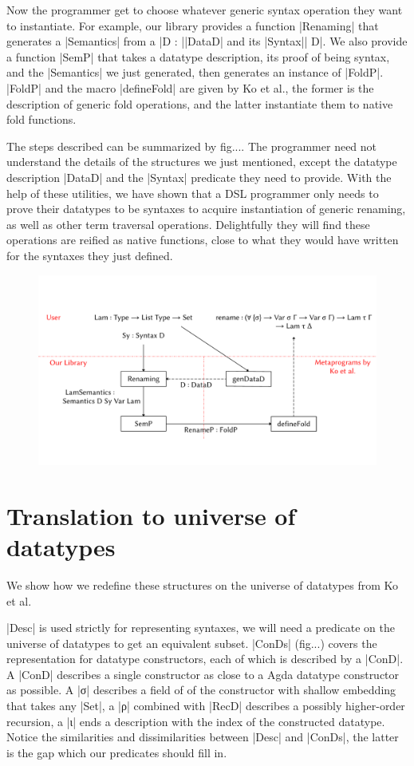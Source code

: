 \documentclass[sigplan,review,fleqn]{acmart}
\renewcommand{\verb}{\collectverb{\color{AgdaFunction}}}
\newcommand{\con}{\collectverb{\color{AgdaInductiveConstructor}}}
\newcommand{\macro}{\collectverb{\color{AgdaMacro}}}
\newcommand{\name}{\collectverb{\color{AgdaSymbol}}}
\begin{document}
Now the programmer get to choose whatever generic syntax operation they want to instantiate.
For example, our library provides a function \verb|Renaming| that generates a \verb|Semantics| from a \name|D : |\verb|DataD| and its \verb|Syntax|\name| D|. 
We also provide a function \verb|SemP| that takes a datatype description, its proof of being syntax, and the \verb|Semantics| we just generated, then generates an instance of \verb|FoldP|.
\verb|FoldP| and the macro \macro|defineFold| are given by Ko et al., the former is the description of generic fold operations, and the latter instantiate them to native fold functions.

The steps described can be summarized by fig.... 
The programmer need not understand the details of the structures we just mentioned, except the datatype description \verb|DataD| and the \verb|Syntax| predicate they need to provide.
With the help of these utilities, we have shown that a DSL programmer only needs to prove their datatypes to be syntaxes to acquire instantiation of generic renaming, as well as other term traversal operations.
Delightfully they will find these operations are reified as native functions, close to what they would have written for the syntaxes they just defined.

\begin{figure}
	\centering
	\includegraphics[width=\textwidth]{Diagram}
\end{figure}

\section{Translation to universe of datatypes}
We show how we redefine these structures on the universe of datatypes from Ko et al.

\verb|Desc| is used strictly for representing syntaxes, we will need a predicate on the universe of datatypes to get an equivalent subset.
\verb|ConDs| (fig...) covers the representation for datatype constructors, each of which is described by a \verb|ConD|.
A \verb|ConD| describes a single constructor as close to a Agda datatype constructor as possible.
A \con|σ| describes a field of of the constructor with shallow embedding that takes any \verb|Set|, a \con|ρ| combined with \verb|RecD| describes a possibly higher-order recursion, a \con|ι| ends a description with the index of the constructed datatype.
Notice the similarities and dissimilarities between \verb|Desc| and \verb|ConDs|, the latter is the gap which our predicates should fill in. 
\end{document}
